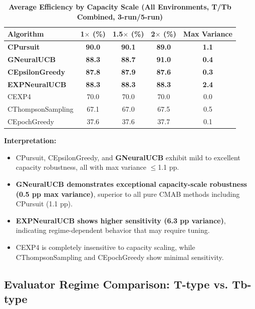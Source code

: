 \documentclass[12pt,a4paper]{article}
\newcommand{\performance}[1]{\textcolor{performancecolor}{\textbf{#1}}}
\newcommand{\legacy}[1]{\textcolor{legacycolor}{\textbf{#1}}}
\newcommand{\neural}[1]{\textcolor{neuralcolor}{\textbf{#1}}}
\begin{document}
\begin{table}[H]
\centering
\caption{\performance{Average Efficiency by Capacity Scale (All Environments, T/Tb Combined, 3-run/5-run)}}
\begin{tabular}{|l|c|c|c|c|}
\hline
\textbf{Algorithm} & \textbf{1$\times$ (\%)} & \textbf{1.5$\times$ (\%)} & \textbf{2$\times$ (\%)} & \textbf{Max Variance} \\
\hline
\hline
\performance{CPursuit}        & \performance{90.0} & \performance{90.1} & \performance{89.0} & \performance{1.1} \\
\neural{GNeuralUCB}          & \neural{88.3} & \neural{88.7} & \neural{91.0} & \neural{0.4} \\
\performance{CEpsilonGreedy} & \performance{87.8} & \performance{87.9} & \performance{87.6} & \performance{0.3} \\
\legacy{EXPNeuralUCB}        & \legacy{88.3}     & \legacy{88.3}     & \legacy{88.3} & \legacy{2.4} \\
CEXP4                        & 70.0              & 70.0              & 70.0 & 0.0 \\
CThompsonSampling            & 67.1              & 67.0              & 67.5 & 0.5 \\
CEpochGreedy                 & 37.6              & 37.6              & 37.7 & 0.1 \\
\hline
\end{tabular}
\end{table}

\textbf{Interpretation:}
\begin{itemize}
\item CPursuit, CEpsilonGreedy, and \neural{GNeuralUCB} exhibit mild to excellent capacity robustness, all with max variance $\leq$1.1 pp.
\item \neural{GNeuralUCB demonstrates exceptional capacity-scale robustness (0.5 pp max variance)}, superior to all pure CMAB methods including CPursuit (1.1 pp).
\item \legacy{EXPNeuralUCB shows higher sensitivity (6.3 pp variance)}, indicating regime-dependent behavior that may require tuning.
\item CEXP4 is completely insensitive to capacity scaling, while CThompsonSampling and CEpochGreedy show minimal sensitivity.
\end{itemize}

\subsection{Evaluator Regime Comparison: T-type vs. Tb-type}
\end{document}
